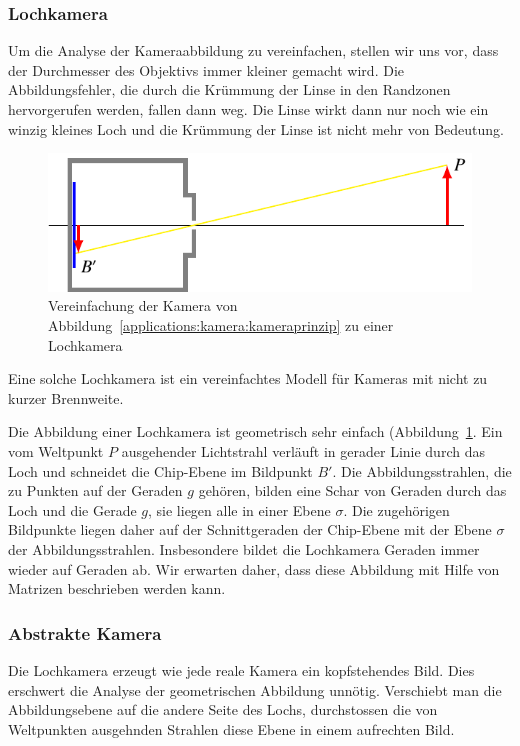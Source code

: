 \subsubsection{Lochkamera}
Um die Analyse der Kameraabbildung zu vereinfachen, stellen wir uns vor,
dass der Durchmesser des Objektivs immer kleiner gemacht wird.
Die Abbildungsfehler, die durch die Krümmung der Linse in den Randzonen
hervorgerufen werden, fallen dann weg.
Die Linse wirkt dann nur noch wie ein winzig kleines Loch und die Krümmung
der Linse ist nicht mehr von Bedeutung.
\begin{figure}
\centering
\includegraphics{applications/kamera/lochkamera.pdf}
\caption{Vereinfachung der Kamera von
Abbildung~\ref{applications:kamera:kameraprinzip} zu einer Lochkamera
\label{applications:kamera:lochkamera}}
\end{figure}
Eine solche Lochkamera ist ein vereinfachtes Modell für Kameras mit
nicht zu kurzer Brennweite.

Die Abbildung einer Lochkamera ist geometrisch sehr einfach
(Abbildung~\ref{applications:kamera:lochkamera}.
Ein vom Weltpunkt $P$ ausgehender Lichtstrahl verläuft in gerader
Linie durch das Loch und schneidet die Chip-Ebene im Bildpunkt $B'$.
Die Abbildungsstrahlen, die zu Punkten auf der Geraden $g$ gehören,
bilden eine Schar von Geraden durch das Loch und die Gerade $g$,
sie liegen alle in einer Ebene $\sigma$.
Die zugehörigen Bildpunkte liegen daher auf der Schnittgeraden der
Chip-Ebene mit der Ebene $\sigma$ der Abbildungsstrahlen.
Insbesondere bildet die Lochkamera Geraden immer wieder auf Geraden ab.
Wir erwarten daher, dass diese Abbildung mit Hilfe von Matrizen
beschrieben werden kann.

\subsubsection{Abstrakte Kamera}
Die Lochkamera erzeugt wie jede reale Kamera ein kopfstehendes Bild.
Dies erschwert die Analyse der geometrischen Abbildung unnötig.
Verschiebt man die Abbildungsebene auf die andere Seite des Lochs,
durchstossen die von Weltpunkten ausgehnden Strahlen diese Ebene in
einem aufrechten Bild.

